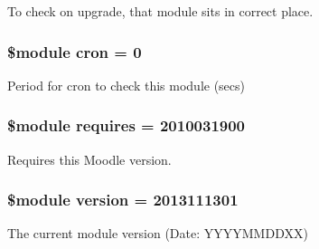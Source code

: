 To check on upgrade, that module sits in correct place. 

\hypertarget{version_8php_ac5478dfb9d76c36e604131b38740821a}{
\subsubsection[{cron}]{\setlength{\rightskip}{0pt plus 5cm}\$module cron = 0}}\label{version_8php_ac5478dfb9d76c36e604131b38740821a}


Period for cron to check this module (secs) 

\hypertarget{version_8php_a4c0ff460b6d47c1f7d1a74f2f5d74b9f}{
\subsubsection[{requires}]{\setlength{\rightskip}{0pt plus 5cm}\$module requires = 2010031900}}\label{version_8php_a4c0ff460b6d47c1f7d1a74f2f5d74b9f}


Requires this Moodle version. 

\hypertarget{version_8php_a1e2b2712a04f3a2db37b7057e4692a62}{
\subsubsection[{version}]{\setlength{\rightskip}{0pt plus 5cm}\$module version = 2013111301}}\label{version_8php_a1e2b2712a04f3a2db37b7057e4692a62}


The current module version (Date\-: Y\-Y\-Y\-Y\-M\-M\-D\-D\-X\-X) 

